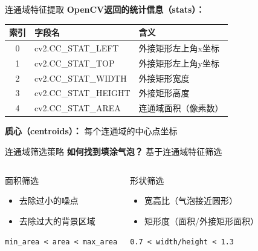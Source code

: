 \begin{frame}{连通域特征提取}
    \textbf{OpenCV返回的统计信息（stats）：}

    \begin{table}
        \centering
        \begin{tabular}{cll}
        \toprule
        索引 & 字段名 & 含义 \\
        \midrule
        0 & cv2.CC\_STAT\_LEFT & 外接矩形左上角x坐标 \\
        1 & cv2.CC\_STAT\_TOP & 外接矩形左上角y坐标 \\
        2 & cv2.CC\_STAT\_WIDTH & 外接矩形宽度 \\
        3 & cv2.CC\_STAT\_HEIGHT & 外接矩形高度 \\
        4 & cv2.CC\_STAT\_AREA & 连通域面积（像素数） \\
        \bottomrule
        \end{tabular}
    \end{table}

    \textbf{质心（centroids）：} 每个连通域的中心点坐标
\end{frame}

\begin{frame}{连通域筛选策略}
    \textbf{如何找到填涂气泡？} 基于连通域特征筛选

    \begin{columns}
        \begin{block}{面积筛选}
        \begin{itemize}
            \item 去除过小的噪点
            \item 去除过大的背景区域
        \end{itemize}
        \texttt{min\_area < area < max\_area}
        \end{block}

        \begin{block}{形状筛选}
        \begin{itemize}
            \item 宽高比（气泡接近圆形）
            \item 矩形度（面积/外接矩形面积）
        \end{itemize}
        \texttt{0.7 < width/height < 1.3}
        \end{block}
    \end{columns}
\end{frame}

